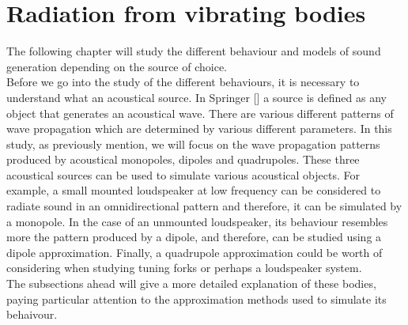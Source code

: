 %
%
%


\chapter{Radiation from vibrating bodies}
\label{chapter4}
The following chapter will study the different behaviour and models of sound generation depending on the source of choice.\\
Before we go into the study of the different behaviours, it is necessary to understand what an acoustical source. In Springer [] a source is defined as any object that generates an acoustical wave. There are various different patterns of wave propagation which are determined by various different parameters. In this study, as previously mention, we will focus on the wave propagation patterns produced by acoustical monopoles, dipoles and quadrupoles. These three acoustical sources can be used to simulate various acoustical objects. For example, a small mounted loudspeaker at low frequency can be considered to radiate sound in an omnidirectional pattern and therefore, it can be simulated by a monopole. In the case of an unmounted loudspeaker, its behaviour resembles more the pattern produced by a dipole, and therefore, can be studied using a dipole approximation. Finally, a quadrupole approximation could be worth of considering when studying tuning forks or perhaps a loudspeaker system.\\
The subsections ahead will give a more detailed explanation of these bodies, paying particular attention to the approximation methods used to simulate its behaivour.
